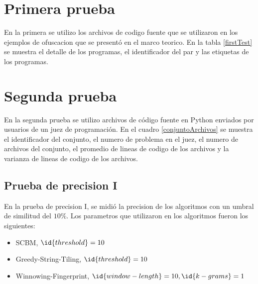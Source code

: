 \section{Primera prueba}
En la primera se utilizo los archivos de codigo fuente que se utilizaron en los ejemplos de ofuscacion que se presentó en el marco teorico. En la tabla \ref{firstTest} se muestra el detalle de los programas, el identificador del par y las etiquetas de los programas.



\section{Segunda prueba}
En la segunda prueba se utilizo archivos de código fuente en Python enviados por usuarios de un juez de programación. En el cuadro \ref{conjuntoArchivos} se muestra el identificador del conjunto, el numero de problema en el juez, el numero de archivos del conjunto, el promedio de lineas de codigo de los archivos y la varianza de lineas de codigo de los archivos.



\subsection{Prueba de precision I}
En la prueba de precision I, se midió la precision de los algoritmos con un umbral de similitud del $10\%$. Los parametros que utilizaron en los algoritmos fueron los siguientes:
\begin{itemize}
  \item SCBM, $\id{threshold} = 10$
  \item Greedy-String-Tiling, $\id{threshold} = 10$
  \item Winnowing-Fingerprint, $\id{window-length} = 10, \id{k-grams} = 1$
\end{itemize}

